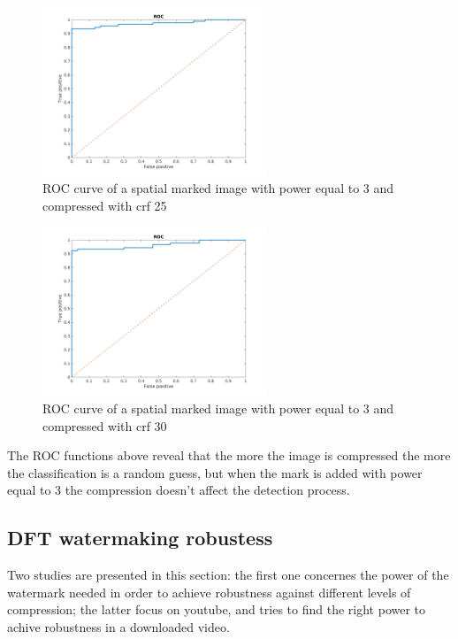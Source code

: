 \begin{figure}[h!]
\centering
\includegraphics[width=0.6\textwidth]{./img/ROC/ROC_gauss_3_25.png}
\caption{\small{ROC curve of a spatial marked image with power equal to 3 and compressed with crf 25 }}
\label{fig:g3crf25}
\end{figure}
\begin{figure}[h!]
\centering
\includegraphics[width=0.6\textwidth]{./img/ROC/ROC_gauss_3_30.png}
\caption{\small{ROC curve of a spatial marked image with power equal to 3 and compressed with crf 30 }}
\label{fig:g3crf30}
\end{figure}
\clearpage

The ROC functions above reveal that the more the image is compressed the more the classification is a random guess, but when the mark is added with power equal to 3 the compression doesn't affect the detection process.

\subsection{DFT watermaking robustess}

Two studies are presented in this section: the first one concernes the power of the watermark needed in order to achieve robustness against different levels of compression; the latter focus on youtube, and tries to find the right power to achive robustness in a downloaded video.
 
